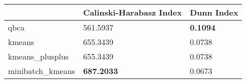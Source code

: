 \begin{table}[htbp]
\centering
\begin{tabular}{lll}
\toprule
 & Calinski-Harabasz Index & Dunn Index \\
\midrule
qbca & 561.5937 & \textbf{0.1094} \\
kmeans & 655.3439 & 0.0738 \\
kmeans_plusplus & 655.3439 & 0.0738 \\
minibatch_kmeans & \textbf{687.2033} & 0.0673 \\
\bottomrule
\end{tabular}
\end{table}
